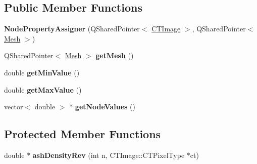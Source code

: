 \subsection*{Public Member Functions}
\begin{DoxyCompactItemize}
\item 
\hypertarget{class_node_property_assigner_a2fa227744efa49d168ee8d7ed438478f}{
{\bfseries NodePropertyAssigner} (QSharedPointer$<$ \hyperlink{class_c_t_image}{CTImage} $>$, QSharedPointer$<$ \hyperlink{class_mesh}{Mesh} $>$)}
\label{class_node_property_assigner_a2fa227744efa49d168ee8d7ed438478f}

\item 
\hypertarget{class_node_property_assigner_a5062e0f645a1695173da84ba2ebfc5b0}{
QSharedPointer$<$ \hyperlink{class_mesh}{Mesh} $>$ {\bfseries getMesh} ()}
\label{class_node_property_assigner_a5062e0f645a1695173da84ba2ebfc5b0}

\item 
\hypertarget{class_node_property_assigner_aa782e4487834a85eff78b7dcb83b35f3}{
double {\bfseries getMinValue} ()}
\label{class_node_property_assigner_aa782e4487834a85eff78b7dcb83b35f3}

\item 
\hypertarget{class_node_property_assigner_ab56583e1816f8e052264aec038d63ad8}{
double {\bfseries getMaxValue} ()}
\label{class_node_property_assigner_ab56583e1816f8e052264aec038d63ad8}

\item 
\hypertarget{class_node_property_assigner_ad3f8df23ab954db71e6e618e60b8c7b2}{
vector$<$ double $>$ $\ast$ {\bfseries getNodeValues} ()}
\label{class_node_property_assigner_ad3f8df23ab954db71e6e618e60b8c7b2}

\end{DoxyCompactItemize}
\subsection*{Protected Member Functions}
\begin{DoxyCompactItemize}
\item 
\hypertarget{class_node_property_assigner_a6060c252615d21b596b72a173a2f803e}{
double $\ast$ {\bfseries ashDensityRev} (int n, CTImage::CTPixelType $\ast$ct)}
\label{class_node_property_assigner_a6060c252615d21b596b72a173a2f803e}

\end{DoxyCompactItemize}
